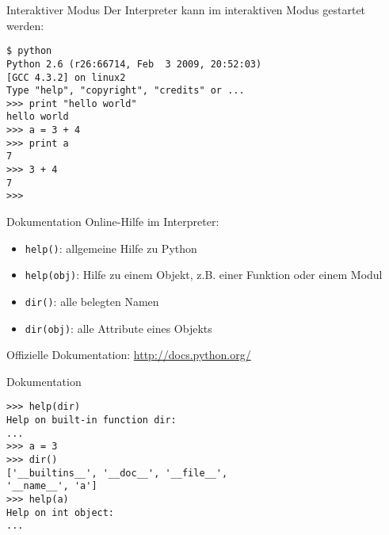 \begin{frame}[fragile]{Interaktiver Modus}
Der Interpreter kann im interaktiven Modus gestartet werden:
\begin{lstlisting}[style=Shell]
$ python
Python 2.6 (r26:66714, Feb  3 2009, 20:52:03) 
[GCC 4.3.2] on linux2
Type "help", "copyright", "credits" or ...
>>> print "hello world"
hello world
>>> a = 3 + 4
>>> print a
7
>>> 3 + 4
7
>>>
\end{lstlisting} %
\end{frame}

\begin{frame}{Dokumentation}
Online-Hilfe im Interpreter:
\begin{itemize}
\item \alert{\lstinline{help()}}: allgemeine Hilfe zu Python
\item \alert{\lstinline{help(obj)}}: Hilfe zu einem Objekt, z.B. einer Funktion oder einem Modul
\item \alert{\lstinline{dir()}}: alle belegten Namen 
\item \alert{\lstinline{dir(obj)}}: alle Attribute eines Objekts
\end{itemize}
\vspace{5mm}
Offizielle Dokumentation: \href{http://docs.python.org/}{http://docs.python.org/}
\end{frame}

\begin{frame}[fragile]{Dokumentation}
\begin{lstlisting}[style=Shell]
>>> help(dir)
Help on built-in function dir:
...
>>> a = 3
>>> dir()
['__builtins__', '__doc__', '__file__', 
'__name__', 'a']
>>> help(a)
Help on int object:
...
\end{lstlisting}
\end{frame}

